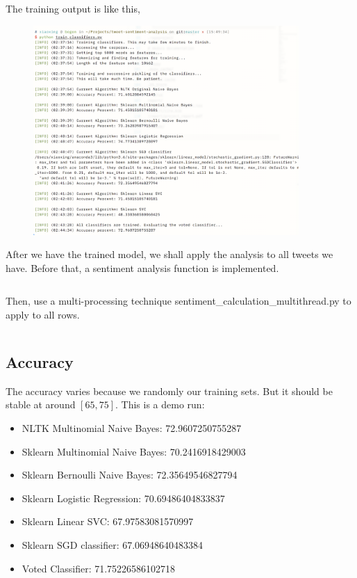 \documentclass[12pt,a4paper]{report}
\begin{document}
      \inputminted[mathescape, linenos, numbersep=5pt, frame=lines, framesep=2mm, breaklines]{python}{../train_classifiers.py}

      The training output is like this,

      \begin{figure}[H]
        \includegraphics[width=0.9\textwidth]{train_output.png}
        \centering
      \end{figure}

      After we have the trained model, we shall apply the analysis to all tweets we have. Before that, a sentiment analysis function is implemented.

      \inputminted[mathescape, linenos, numbersep=5pt, frame=lines, framesep=2mm, breaklines]{python}{../sentiment.py}

      Then, use a multi-processing technique sentiment\_calculation\_multithread.py to apply to all rows.

      \inputminted[mathescape, linenos, numbersep=5pt, frame=lines, framesep=2mm, breaklines]{python}{../sentiment_calculation_multithread.py}

    \subsection{Accuracy}
      The accuracy varies because we randomly our training sets. But it should be stable at around $[65, 75]$. This is a demo run:

      \begin{itemize}
        \item NLTK Multinomial Naive Bayes: 72.9607250755287
        \item Sklearn Multinomial Naive Bayes: 70.2416918429003
        \item Sklearn Bernoulli Naive Bayes: 72.35649546827794
        \item Sklearn Logistic Regression: 70.69486404833837
        \item Sklearn Linear SVC: 67.97583081570997
        \item Sklearn SGD classifier: 67.06948640483384
        \item Voted Classifier: 71.75226586102718
      \end{itemize}
\end{document}
